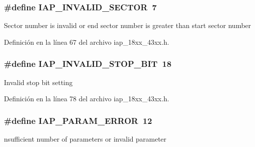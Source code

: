\subsubsection[{\texorpdfstring{I\+A\+P\+\_\+\+I\+N\+V\+A\+L\+I\+D\+\_\+\+S\+E\+C\+T\+OR}{IAP_INVALID_SECTOR}}]{\setlength{\rightskip}{0pt plus 5cm}\#define I\+A\+P\+\_\+\+I\+N\+V\+A\+L\+I\+D\+\_\+\+S\+E\+C\+T\+OR~7}\hypertarget{group___i_a_p__18_x_x__43_x_x_gab3af925b968fb59823d08d77261aebf7}{}\label{group___i_a_p__18_x_x__43_x_x_gab3af925b968fb59823d08d77261aebf7}
Sector number is invalid or end sector number is greater than start sector number 

Definición en la línea 67 del archivo iap\+\_\+18xx\+\_\+43xx.\+h.

\subsubsection[{\texorpdfstring{I\+A\+P\+\_\+\+I\+N\+V\+A\+L\+I\+D\+\_\+\+S\+T\+O\+P\+\_\+\+B\+IT}{IAP_INVALID_STOP_BIT}}]{\setlength{\rightskip}{0pt plus 5cm}\#define I\+A\+P\+\_\+\+I\+N\+V\+A\+L\+I\+D\+\_\+\+S\+T\+O\+P\+\_\+\+B\+IT~18}\hypertarget{group___i_a_p__18_x_x__43_x_x_ga6c61111082b04ba6780151c83f8c3644}{}\label{group___i_a_p__18_x_x__43_x_x_ga6c61111082b04ba6780151c83f8c3644}
Invalid stop bit setting 

Definición en la línea 78 del archivo iap\+\_\+18xx\+\_\+43xx.\+h.

\subsubsection[{\texorpdfstring{I\+A\+P\+\_\+\+P\+A\+R\+A\+M\+\_\+\+E\+R\+R\+OR}{IAP_PARAM_ERROR}}]{\setlength{\rightskip}{0pt plus 5cm}\#define I\+A\+P\+\_\+\+P\+A\+R\+A\+M\+\_\+\+E\+R\+R\+OR~12}\hypertarget{group___i_a_p__18_x_x__43_x_x_ga6bf1bec9cbb419f8006447171e9750b7}{}\label{group___i_a_p__18_x_x__43_x_x_ga6bf1bec9cbb419f8006447171e9750b7}
nsufficient number of parameters or invalid parameter 

